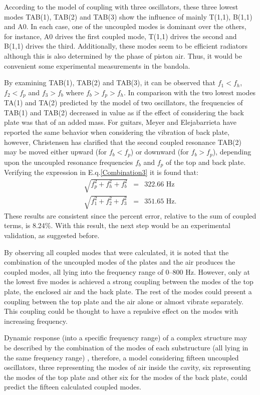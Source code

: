 According to the model of coupling with three oscillators, these three lowest modes TAB(1), TAB(2) and TAB(3) show the influence of mainly T(1,1), B(1,1) and A0. In each case, one of the uncoupled modes is dominant over the others, for instance, A0 drives the first coupled mode, T(1,1) drives the second and B(1,1) drives the third. Additionally, these modes seem to be efficient radiators although this is also determined by the phase of piston air. Thus, it would be convenient some experimental measurements in the bandola.

By examining TAB(1), TAB(2) and TAB(3), it can be observed that $f_1<f_h$, $f_2<f_p$ and $f_3>f_b$ where $f_b>f_p>f_h$. In comparison with the two lowest modes TA(1) and TA(2) predicted by the model of two oscillators, the frequencies of TAB(1) and TAB(2) decreased in value as if the effect of considering the back plate was that of an added mass. For guitars, Meyer and Elejabarrieta \cite{Elejabarrieta, Elejabarrieta1} have reported the same behavior when considering the vibration of back plate, however, Christensen \cite{Christensen3} has clarified that the second coupled resonance TAB(2) may be moved either upward (for $f_b<f_p$) or downward (for $f_b>f_p$), depending upon the uncoupled resonance frequencies $f_b$ and $f_p$ of the top and back plate.\\Verifying the expression in E.q.\ref{Combination3} it is found that:
\begin{eqnarray*}
\sqrt{f_p^2 + f_h^2 + f_b^2} & = & 322.66 \text{ Hz}\\
\sqrt{f_1^2 + f_2^2 + f_3^2} & = & 351.65 \text{ Hz}.
\end{eqnarray*}
These results are consistent since the percent error, relative to the sum of coupled terms, is 8.24\%. With this result, the next step would be an experimental validation, as suggested before.

By observing all coupled modes that were calculated, it is noted that the combination of the uncoupled modes of the plates and the air produces the coupled modes, all lying into the frequency range of {0--800 Hz}. However, only at the lowest five modes is achieved a strong coupling between the modes of the top plate, the enclosed air and the back plate. The rest of the modes could present a coupling between the top plate and the air alone or almost vibrate separately. This coupling could be thought to have a repulsive effect on the modes with increasing frequency.   

Dynamic response (into a specific frequency range) of a complex structure may be described by the combination of the modes of each substructure (all lying in the same frequency range) \cite{Ewins}, therefore, a model considering fifteen uncoupled oscillators, three representing the modes of air inside the cavity, six representing the modes of the top plate and other six for the modes of the back plate, could predict the fifteen calculated coupled modes. 

